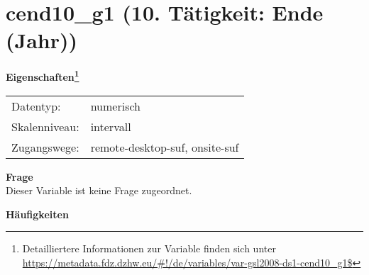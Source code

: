 
    \setcounter{footnote}{0}

    \vspace*{-1.8cm}
	\section{cend10\_g1 (10. Tätigkeit: Ende (Jahr))}
	\label{section:cend10_g1}



    \vspace*{0.5cm}
    \noindent\textbf{Eigenschaften\footnote{Detailliertere Informationen zur Variable finden sich unter
		\url{https://metadata.fdz.dzhw.eu/\#!/de/variables/var-gsl2008-ds1-cend10_g1$}}}\\
	\begin{tabularx}{\hsize}{@{}lX}
	Datentyp: & numerisch \\
	Skalenniveau: & intervall \\
	Zugangswege: &
	  remote-desktop-suf, 
	  onsite-suf
 \\
    \end{tabularx}



		\vspace*{0.5cm}
		\noindent\textbf{Frage}\\
		Dieser Variable ist keine Frage zugeordnet.





        		\vspace*{0.5cm}
                \noindent\textbf{Häufigkeiten}

